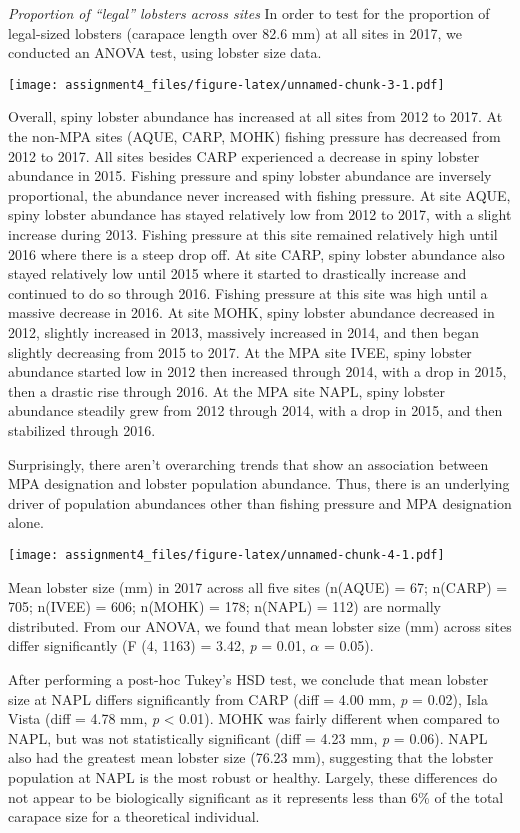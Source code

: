 \documentclass[]{article}
\begin{document}
\emph{Proportion of ``legal'' lobsters across sites} In order to test
for the proportion of legal-sized lobsters (carapace length over 82.6
mm) at all sites in 2017, we conducted an ANOVA test, using lobster size
data.

\texttt{[image: assignment4\_files/figure-latex/unnamed-chunk-3-1.pdf]}

Overall, spiny lobster abundance has increased at all sites from 2012 to
2017. At the non-MPA sites (AQUE, CARP, MOHK) fishing pressure has
decreased from 2012 to 2017. All sites besides CARP experienced a
decrease in spiny lobster abundance in 2015. Fishing pressure and spiny
lobster abundance are inversely proportional, the abundance never
increased with fishing pressure. At site AQUE, spiny lobster abundance
has stayed relatively low from 2012 to 2017, with a slight increase
during 2013. Fishing pressure at this site remained relatively high
until 2016 where there is a steep drop off. At site CARP, spiny lobster
abundance also stayed relatively low until 2015 where it started to
drastically increase and continued to do so through 2016. Fishing
pressure at this site was high until a massive decrease in 2016. At site
MOHK, spiny lobster abundance decreased in 2012, slightly increased in
2013, massively increased in 2014, and then began slightly decreasing
from 2015 to 2017. At the MPA site IVEE, spiny lobster abundance started
low in 2012 then increased through 2014, with a drop in 2015, then a
drastic rise through 2016. At the MPA site NAPL, spiny lobster abundance
steadily grew from 2012 through 2014, with a drop in 2015, and then
stabilized through 2016.

Surprisingly, there aren't overarching trends that show an association
between MPA designation and lobster population abundance. Thus, there is
an underlying driver of population abundances other than fishing
pressure and MPA designation alone.

\texttt{[image: assignment4\_files/figure-latex/unnamed-chunk-4-1.pdf]}

Mean lobster size (mm) in 2017 across all five sites (n(AQUE) = 67;
n(CARP) = 705; n(IVEE) = 606; n(MOHK) = 178; n(NAPL) = 112) are normally
distributed. From our ANOVA, we found that mean lobster size (mm) across
sites differ significantly (F (4, 1163) = 3.42, \emph{p} = 0.01,
\(\alpha\) = 0.05).

After performing a post-hoc Tukey's HSD test, we conclude that mean
lobster size at NAPL differs significantly from CARP (diff = 4.00 mm,
\emph{p} = 0.02), Isla Vista (diff = 4.78 mm, \emph{p} \textless{}
0.01). MOHK was fairly different when compared to NAPL, but was not
statistically significant (diff = 4.23 mm, \emph{p} = 0.06). NAPL also
had the greatest mean lobster size (76.23 mm), suggesting that the
lobster population at NAPL is the most robust or healthy. Largely, these
differences do not appear to be biologically significant as it
represents less than 6\% of the total carapace size for a theoretical
individual.
\end{document}
